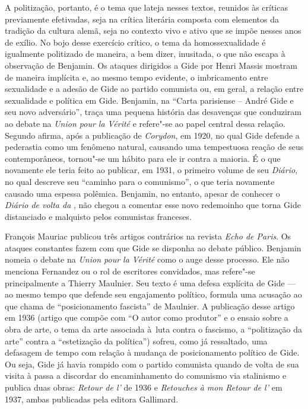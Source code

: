 A politização, portanto, é o tema que lateja nesses textos, reunidos às
críticas previamente efetivadas, seja na crítica literária composta com
elementos da tradição da cultura alemã, seja no contexto vivo e ativo
que se impõe nesses anos de exílio. No bojo desse exercício crítico, o
tema da homossexualidade é igualmente politizado de maneira, a bem
dizer, inusitada, o que não escapa à observação de Benjamin. Os ataques
dirigidos a Gide por Henri Massis mostram de maneira implícita e, ao
mesmo tempo evidente, o imbricamento entre sexualidade e a adesão de
Gide ao partido comunista ou, em geral, a relação entre sexualidade e
política em Gide. Benjamin, na ``Carta parisiense  -- André Gide e seu
novo adversário'', traça uma pequena história das desavenças que
conduziram ao debate na \emph{Union pour la Vérité} e refere"-se ao papel
central dessa relação. Segundo afirma, após a publicação de
\emph{Corydon}, em 1920, no qual Gide defende a pederastia como um
fenômeno natural, causando uma tempestuosa reação de seus
contemporâneos, tornou"-se um hábito para ele ir contra a maioria. É o
que novamente ele teria feito ao publicar, em 1931, o primeiro volume de
seu \emph{Diário}, no qual descreve seu ``caminho para o comunismo'', o
que teria novamente causado uma espessa polêmica. Benjamin, no
entanto, apesar de conhecer o \emph{Diário de volta da }, não
chegou a comentar esse novo redemoinho que torna Gide distanciado e
malquisto pelos comunistas franceses.

François Mauriac publicou três artigos contrários na revista \emph{Echo de
Paris}. Os ataques constantes fazem com que Gide se disponha ao debate
público. Benjamin nomeia o debate na \emph{Union pour la Vérité} como o
auge desse processo. Ele não menciona Fernandez ou o rol de escritores
convidados, mas refere"-se principalmente a Thierry Maulnier. Seu texto é
uma defesa explícita de Gide --- ao mesmo tempo que defende seu
engajamento político, formula uma acusação ao que chama de
``posicionamento fascista'' de Maulnier. A publicação desse artigo em
1936 (artigo que compõe com ``O autor como produtor'' e o ensaio sobre a
obra de arte, o tema da arte associada à~luta contra o fascismo, a
``politização da arte'' contra a ``estetização da política'') sofreu,
como já ressaltado, uma defasagem de tempo com relação à mudança de
posicionamento político de Gide. Ou seja, Gide já havia rompido com o
partido comunista quando de volta de sua visita à  passa a
discordar do encaminhamento do comunismo via stalinismo e publica duas
obras: \emph{Retour de l'} de 1936 e \emph{Retouches à mon
Retour de l'} em 1937, ambas publicadas pela editora Gallimard.

